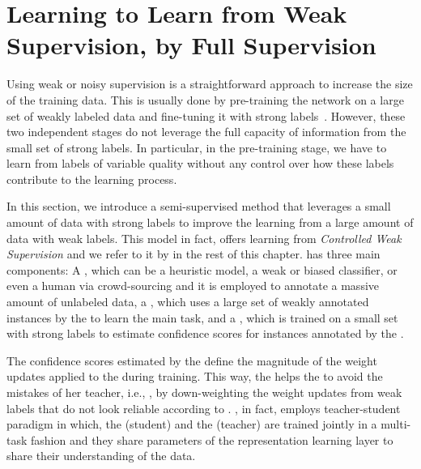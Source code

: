 \section{Learning to Learn from Weak Supervision, by Full Supervision}
\label{sec:meta_learning}
Using weak or noisy supervision is a straightforward approach to increase the size of the training data. This is usually done by pre-training the network on a large set of weakly labeled data and fine-tuning it with strong labels~\cite{Dehghani:2017:SIGIR,Severyn:2015:SIGIR}. 
However, these two independent stages do not leverage the full capacity of information from the small set of strong labels.  In particular, in the pre-training stage, we have to learn from labels of variable quality without any control over how these labels contribute to the learning process.

In this section, we introduce a semi-\:supervised method that leverages a small amount of data with strong labels to improve the learning from a large amount of data with weak labels. This model in fact, offers learning from \emph{Controlled Weak Supervision} and we refer to it by \emph{\cws} in the rest of this chapter.
%
\cws has three main components:
A \wa, which can be a heuristic model, a weak or biased classifier, or even a human via crowd-sourcing and it is employed to annotate a massive amount of unlabeled data, a \tnet, which uses a large set of weakly annotated instances by the \wa to learn the main task, and a \cnet, which is trained on a small set with strong labels to estimate confidence scores for instances annotated by the \wa. 

The confidence scores estimated by the \cnet define the magnitude of the weight updates applied to the \tnet during training. This way, the \cnet helps the \tnet to avoid the mistakes of her teacher, i.e., \wa, by down-weighting the weight updates from weak labels that do not look reliable according to \cnet.
%
\cws, in fact, employs teacher-student paradigm in which, the \tnet (student) and the \cnet (teacher) are trained jointly in a multi-task fashion and they share parameters of the representation learning layer to share their understanding of the data.

